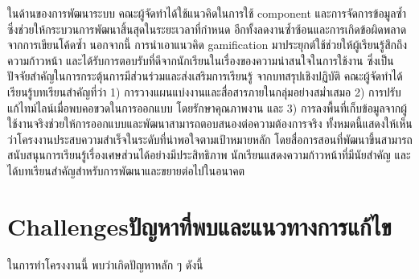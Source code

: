 ในด้านของการพัฒนาระบบ คณะผู้จัดทำได้ใช้แนวคิดในการใช้ component และการจัดการข้อมูลซ้ำ ซึ่งช่วยให้กระบวนการพัฒนาสิ้นสุดในระยะเวลาที่กำหนด อีกทั้งลดงานซ้ำซ้อนและการเกิดข้อผิดพลาดจากการเขียนโค้ดซ้ำ นอกจากนี้ การนำเอาแนวคิด gamification มาประยุกต์ใช้ช่วยให้ผู้เรียนรู้สึกถึงความก้าวหน้า และได้รับการตอบรับที่ดีจากนักเรียนในเรื่องของความน่าสนใจในการใช้งาน ซึ่งเป็นปัจจัยสำคัญในการกระตุ้นการมีส่วนร่วมและส่งเสริมการเรียนรู้
จากบทสรุปเชิงปฏิบัติ คณะผู้จัดทำได้เรียนรู้บทเรียนสำคัญที่ว่า 1) การวางแผนแบ่งงานและสื่อสารภายในกลุ่มอย่างสม่ำเสมอ 2) การปรับแก้ไทม์ไลน์เมื่อพบคอขวดในการออกแบบ โดยรักษาคุณภาพงาน และ 3) การลงพื้นที่เก็บข้อมูลจากผู้ใช้งานจริงช่วยให้การออกแบบและพัฒนาสามารถตอบสนองต่อความต้องการจริง
ทั้งหมดนี้แสดงให้เห็นว่าโครงงานประสบความสำเร็จในระดับที่น่าพอใจตามเป้าหมายหลัก โดยสื่อการสอนที่พัฒนาขึ้นสามารถสนับสนุนการเรียนรู้เรื่องเศษส่วนได้อย่างมีประสิทธิภาพ นักเรียนแสดงความก้าวหน้าที่มีนัยสำคัญ และได้บทเรียนสำคัญสำหรับการพัฒนาและขยายต่อไปในอนาคต
\section{\ifenglish Challenges\else ปัญหาที่พบและแนวทางการแก้ไข\fi}
ในการทำโครงงานนี้ พบว่าเกิดปัญหาหลัก ๆ ดังนี้

